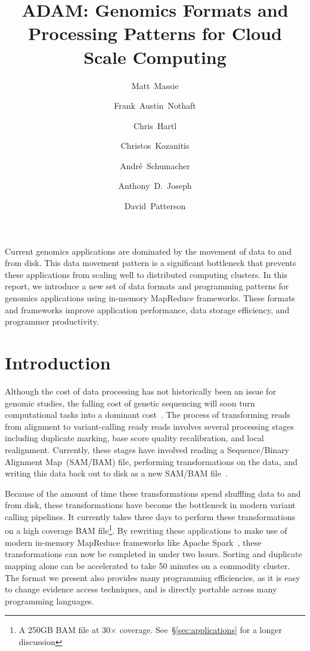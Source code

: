 \documentclass[10pt,twocolumn]{article}
\date{}
\theoremstyle{plain}
\begin{document}
\title{ADAM: Genomics Formats and Processing Patterns for Cloud Scale Computing}
\author[1]{Matt~Massie}
\author[1]{Frank~Austin~Nothaft}
\author[1,2]{Chris~Hartl}
\author[1]{Christos~Kozanitis}
\author[3]{Andr\'{e}~Schumacher}
\author[1]{Anthony~D.~Joseph}
\author[1]{David~Patterson}

\maketitle

\raggedbottom

\abstract

Current genomics applications are dominated by the movement of data to and from disk. This data movement pattern
is a significant bottleneck that prevents these applications from scaling well to distributed computing clusters. In this report,
we introduce a new set of data formats and programming patterns for genomics applications using in-memory MapReduce
frameworks. These formats and frameworks improve application performance, data storage efficiency, and programmer productivity.

\section{Introduction}
\label{sec:introduction}

Although the cost of data processing has not historically been an issue for genomic studies, the falling cost of genetic
sequencing will soon turn computational tasks into a dominant cost~\cite{nhgri}. The process of transforming reads
from alignment to variant-calling ready reads involves several processing stages including duplicate marking, base
score quality recalibration, and local realignment. Currently, these stages have involved reading a Sequence/Binary
Alignment Map~(SAM/BAM) file, performing transformations on the data, and writing this data back out to disk as a
new SAM/BAM file~\cite{li09}.

Because of the amount of time these transformations spend shuffling data to and from disk, these transformations have become
the bottleneck in modern variant calling pipelines. It currently takes three days to perform these transformations on a high
coverage BAM file\footnote{A 250GB BAM file at 30$\times$ coverage. See~\S\ref{sec:applications} for a longer discussion}. By
rewriting these applications to make use of modern in-memory MapReduce frameworks like Apache Spark~\cite{zaharia10}, these
transformations can now be completed in under two hours. Sorting and duplicate mapping alone can be accelerated to take
50 minutes on a commodity cluster. The format we present also provides many programming efficiencies, as it is easy to
change evidence access techniques, and is directly portable across many programming languages.
\end{document}
